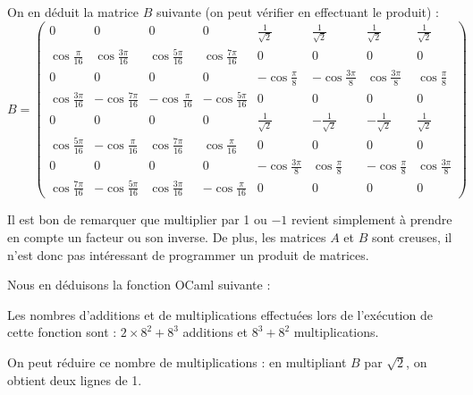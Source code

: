 On en déduit la matrice $B$ suivante (on peut vérifier en effectuant le produit) :
\[
B=\begin{pmatrix}
    0 & 0 & 0 & 0 & \frac{1}{\sqrt2} & \frac{1}{\sqrt2} & \frac{1}{\sqrt2} & \frac{1}{\sqrt2} \\[6pt]
    \cos\frac{\pi}{16} & \cos\frac{3\pi}{16} & \cos\frac{5\pi}{16} & \cos\frac{7\pi}{16} & 0 & 0 & 0 & 0 \\[6pt]
    0 & 0 & 0 & 0 & -\cos\frac{\pi}{8} & -\cos\frac{3\pi}{8} & \cos\frac{3\pi}{8} & \cos\frac{\pi}{8} \\[6pt]
    \cos\frac{3\pi}{16} & -\cos\frac{7\pi}{16} & -\cos\frac{\pi}{16} & -\cos\frac{5\pi}{16} & 0 & 0 & 0 & 0 \\[6pt]
    0 & 0 & 0 & 0 & \frac{1}{\sqrt2} & -\frac{1}{\sqrt2} & -\frac{1}{\sqrt2} & \frac{1}{\sqrt2} \\[6pt]
    \cos\frac{5\pi}{16} & -\cos\frac{\pi}{16} & \cos\frac{7\pi}{16} & \cos\frac{\pi}{16} & 0 & 0 & 0 & 0 \\[6pt]
    0 & 0 & 0 & 0 & -\cos\frac{3\pi}{8} & \cos\frac{\pi}{8} & -\cos\frac{\pi}{8} & \cos\frac{3\pi}{8} \\[6pt]
    \cos\frac{7\pi}{16} & -\cos\frac{5\pi}{16} & \cos\frac{3\pi}{16} & -\cos\frac{\pi}{16} & 0 & 0 & 0 & 0
\end{pmatrix}
\]

Il est bon de remarquer que multiplier par 1 ou $-1$ revient simplement à prendre en compte un facteur ou son inverse. De plus, les matrices $A$ et $B$ sont creuses, il n'est donc pas intéressant de programmer un produit de matrices.
\medskip

Nous en déduisons la fonction OCaml suivante :



Les nombres d'additions et de multiplications effectuées lors de l'exécution de cette fonction sont : $2 \times 8^2 + 8^3$ additions et $8^3+8^2$ multiplications.
\medskip

On peut réduire ce nombre de multiplications : en multipliant $B$ par $\sqrt{2}$, on obtient deux lignes de 1.
\bigskip

\Fin
